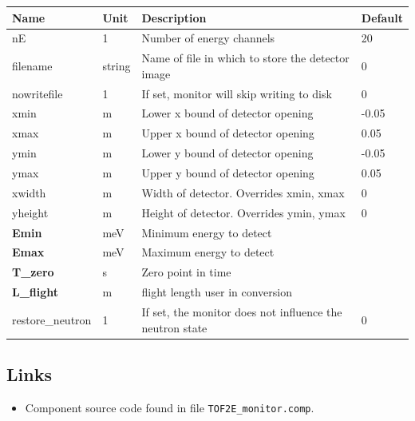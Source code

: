 \begin{longtable}{p{}p{}p{}p{}}
\toprule
\textbf{Name} & \textbf{Unit} & \textbf{Description} & \textbf{Default} \\
\midrule
\endhead
nE & 1 & Number of energy channels & 20 \\
filename & string & Name of file in which to store the detector image & 0 \\
nowritefile & 1 & If set, monitor will skip writing to disk & 0 \\
xmin & m & Lower x bound of detector opening & -0.05 \\
xmax & m & Upper x bound of detector opening & 0.05 \\
ymin & m & Lower y bound of detector opening & -0.05 \\
ymax & m & Upper y bound of detector opening & 0.05 \\
xwidth & m & Width of detector. Overrides xmin, xmax & 0 \\
yheight & m & Height of detector. Overrides ymin, ymax & 0 \\
\textbf{Emin} & meV & Minimum energy to detect &  \\
\textbf{Emax} & meV & Maximum energy to detect &  \\
\textbf{T\_zero} & s & Zero point in time &  \\
\textbf{L\_flight} & m & flight length user in conversion &  \\
restore\_neutron & 1 & If set, the monitor does not influence the neutron state & 0 \\
\bottomrule
\end{longtable}

\subsection*{Links}
\begin{itemize}
  \item Component source code found in file \texttt{TOF2E\_monitor.comp}.
\end{itemize}
